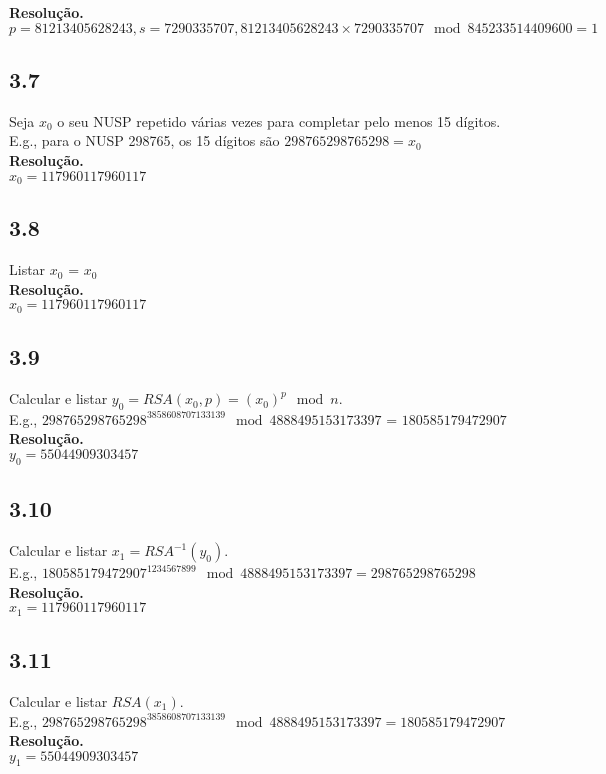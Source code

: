 \documentclass[12pt,letterpaper]{article}
\newcommand\answer{\textbf{Resolução.}\xspace}
\begin{document}
\answer \\
$p = 81213405628243, s = 7290335707, 81213405628243 \times 7290335707 \mod 845233514409600 = 1$

\subsection*{3.7}
Seja $x_0$ o seu NUSP repetido várias vezes para completar pelo menos 15 dígitos. \\ 
E.g., para o NUSP 298765, os 15 dígitos são $298765298765298 = x_0$ \\

\answer \\
$x_0 = 117960117960117$

\subsection*{3.8}
Listar $x_0$ = $x_0$ \\

\answer \\
$x_0 = 117960117960117$

\subsection*{3.9}
Calcular e listar $y_0 = RSA(x_0,p) = (x_0)^p \mod n$. \\
E.g., $298765298765298^{3858608707133139} \mod 4888495153173397$ = $180585179472907$ \\

\answer \\
$y_0 = 55044909303457$

\subsection*{3.10}
Calcular e listar $x_1 = RSA^{-1}(y_0)$. \\
E.g., $180585179472907^{1234567899} \mod 4888495153173397 = 298765298765298$ \\

\answer \\
$x_1 = 117960117960117$

\subsection*{3.11}
Calcular e listar $RSA(x_1)$. \\
E.g., $298765298765298^{3858608707133139} \mod 4888495153173397 = 180585179472907$ \\

\answer \\
$y_1 = 55044909303457$
\end{document}
